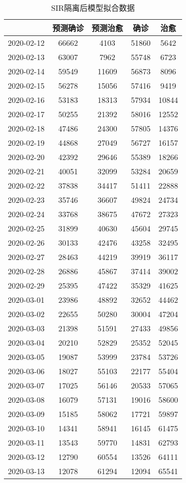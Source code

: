 \begin{longtable}{ccccc}
\caption{SIR隔离后模型拟合数据}\\
\hline
&预测确诊&预测治愈&确诊&治愈\\
\hline
2020-02-12&66662&4103&51860&5642\\
2020-02-13&63007&7962&55748&6723\\
2020-02-14&59549&11609&56873&8096\\
2020-02-15&56278&15056&57416&9419\\
2020-02-16&53183&18313&57934&10844\\
2020-02-17&50255&21392&58016&12552\\
2020-02-18&47486&24300&57805&14376\\
2020-02-19&44868&27049&56727&16157\\
2020-02-20&42392&29646&55389&18266\\
2020-02-21&40051&32099&53284&20659\\
2020-02-22&37838&34417&51411&22888\\
2020-02-23&35746&36607&49824&24734\\
2020-02-24&33768&38675&47672&27323\\
2020-02-25&31899&40630&45604&29745\\
2020-02-26&30133&42476&43258&32495\\
2020-02-27&28463&44219&39919&36117\\
2020-02-28&26886&45867&37414&39002\\
2020-02-29&25395&47422&35329&41625\\
2020-03-01&23986&48892&32652&44462\\
2020-03-02&22655&50280&30004&47204\\
2020-03-03&21398&51591&27433&49856\\
2020-03-04&20210&52829&25352&52045\\
2020-03-05&19087&53999&23784&53726\\
2020-03-06&18027&55103&22177&55404\\
2020-03-07&17025&56146&20533&57065\\
2020-03-08&16079&57131&19016&58600\\
2020-03-09&15185&58062&17721&59897\\
2020-03-10&14341&58941&16145&61475\\
2020-03-11&13543&59770&14831&62793\\
2020-03-12&12790&60554&13526&64111\\
2020-03-13&12078&61294&12094&65541\\

\end{longtable}

